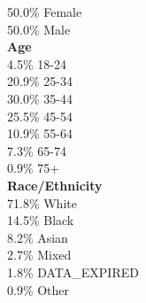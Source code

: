 50.0\% Female \\
50.0\% Male \\

\textbf{Age} \\
4.5\% 18-24 \\
20.9\% 25-34 \\
30.0\% 35-44 \\
25.5\% 45-54 \\
10.9\% 55-64 \\
7.3\% 65-74 \\
0.9\% 75+ \\

\textbf{Race/Ethnicity} \\
71.8\% White \\
14.5\% Black \\
8.2\% Asian \\
2.7\% Mixed \\
1.8\% DATA_EXPIRED \\
0.9\% Other \\

